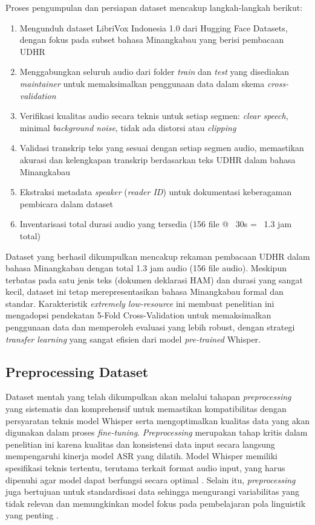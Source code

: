 Proses pengumpulan dan persiapan dataset mencakup langkah-langkah berikut:

\begin{enumerate}[noitemsep]
    \item Mengunduh dataset LibriVox Indonesia 1.0 dari Hugging Face Datasets, dengan fokus pada subset bahasa Minangkabau yang berisi pembacaan UDHR
    \item Menggabungkan seluruh audio dari folder \textit{train} dan \textit{test} yang disediakan \textit{maintainer} untuk memaksimalkan penggunaan data dalam skema \textit{cross-validation}
    \item Verifikasi kualitas audio secara teknis untuk setiap segmen: \textit{clear speech}, minimal \textit{background noise}, tidak ada distorsi atau \textit{clipping}
    \item Validasi transkrip teks yang sesuai dengan setiap segmen audio, memastikan akurasi dan kelengkapan transkrip berdasarkan teks UDHR dalam bahasa Minangkabau
    \item Ekstraksi metadata \textit{speaker} (\textit{reader ID}) untuk dokumentasi keberagaman pembicara dalam dataset
    \item Inventarisasi total durasi audio yang tersedia (156 file @ ~30s = ~1.3 jam total)
\end{enumerate}

Dataset yang berhasil dikumpulkan mencakup rekaman pembacaan UDHR dalam bahasa Minangkabau dengan total 1.3 jam audio (156 file audio). Meskipun terbatas pada satu jenis teks (dokumen deklarasi HAM) dan durasi yang sangat kecil, dataset ini tetap merepresentasikan bahasa Minangkabau formal dan standar. Karakteristik \textit{extremely low-resource} ini membuat penelitian ini mengadopsi pendekatan 5-Fold Cross-Validation untuk memaksimalkan penggunaan data dan memperoleh evaluasi yang lebih robust, dengan strategi \textit{transfer learning} yang sangat efisien dari model \textit{pre-trained} Whisper.

\subsection{Preprocessing Dataset}
\label{III.Langkah4}

Dataset mentah yang telah dikumpulkan akan melalui tahapan \textit{preprocessing} yang sistematis dan komprehensif untuk memastikan kompatibilitas dengan persyaratan teknis model Whisper serta mengoptimalkan kualitas data yang akan digunakan dalam proses \textit{fine-tuning}. \textit{Preprocessing} merupakan tahap kritis dalam penelitian ini karena kualitas dan konsistensi data input secara langsung mempengaruhi kinerja model ASR yang dilatih. Model Whisper memiliki spesifikasi teknis tertentu, terutama terkait format audio input, yang harus dipenuhi agar model dapat berfungsi secara optimal \cite{radford2023whisper}. Selain itu, \textit{preprocessing} juga bertujuan untuk standardisasi data sehingga mengurangi variabilitas yang tidak relevan dan memungkinkan model fokus pada pembelajaran pola linguistik yang penting \cite{mcfee2015librosa}.

